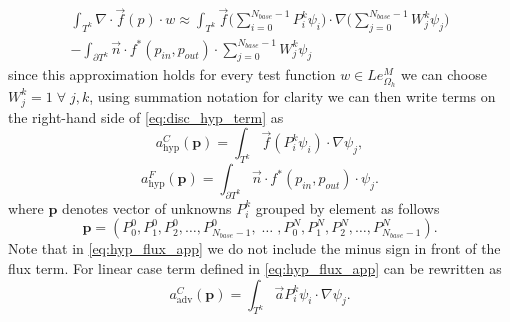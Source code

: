 \begin{multline}
    \label{eq:disc_hyp_term}
    \int_{T^k} \nabla\cdot \vec{f}(p)\cdot w \approx \int_{T^k} 
    \vec{f}\Big(\sum\limits_{i=0}^{N_{base} - 1} 
    P_i^k\psi_i\Big)\cdot\nabla\Big(\sum\limits_{j=0}^{N_{base} - 1} 
    W_j^k\psi_j\Big)\\    
    -\int_{\partial{T^k}} \vec{n} \cdot f^{*} (p_{in}, p_{out})\cdot 
    \sum\limits_{j=0}^{N_{base} - 1} W_j^k\psi_j
\end{multline}
since this approximation holds for every test function $w \in 
Le_{\Omega_h}^{M}$ we can choose $W_j^k = 1 \; \forall \; 
j, k$, using summation notation for clarity we can then write terms on the  right-hand 
side of \eqref{eq:disc_hyp_term} as 
\begin{equation}\label{eq:hyp_stiff_app}
    a^C_\mathrm{hyp}(\mathbf{p}) = \int_{T^k} \vec{f}(P_i^k\psi_i)\cdot\nabla\psi_j, 
\end{equation}
\begin{equation}\label{eq:hyp_flux_app}
    a^F_\mathrm{hyp}(\mathbf{p}) = \int_{\partial{T^k}} \vec{n} \cdot f^{*} (p_{in}, 
    p_{out})\cdot\psi_j.
\end{equation}
where $\mathbf{p}$ denotes vector of unknowns $P^k_i$ grouped by element as follows
\begin{equation}
    \mathbf{p} = \left(P^0_0, P^0_1, P^0_2, \ldots, P^0_{N_{base}-1}, \; \ldots \; ,
    P^{N}_0, P^{N}_1, P^{N}_2, \ldots, P^{N}_{N_{base} - 1}  \right).
\end{equation}
Note that in \eqref{eq:hyp_flux_app} we do not include the minus sign in front 
of the flux term. For linear case term defined in \eqref{eq:hyp_flux_app} can be 
rewritten as
\begin{equation}
     a^C_\mathrm{adv}(\mathbf{p}) = \int_{T^k} \vec{a}P_i^k\psi_i\cdot\nabla\psi_j.
\end{equation} 


